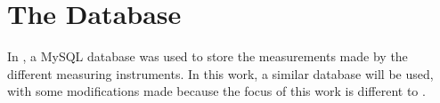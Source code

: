 \section{The Database}

In \cite{biksbois}, a MySQL database was used to store the measurements made by the different measuring instruments. In this work, a similar database will be used, with some modifications made because the focus of this work is different to \cite{biksbois}.


% 